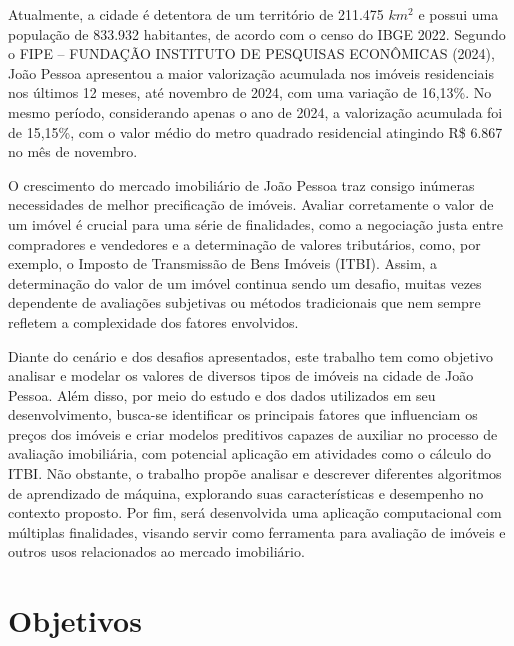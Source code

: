 \documentclass[
  12pt,
  a4paper,
]{scrreprt}
\begin{document}
\vspace{12pt}

Atualmente, a cidade é detentora de um território de 211.475 \(km^2\) e
possui uma população de 833.932 habitantes, de acordo com o censo do
IBGE 2022. Segundo o FIPE -- FUNDAÇÃO INSTITUTO DE PESQUISAS ECONÔMICAS
(2024), João Pessoa apresentou a maior valorização acumulada nos imóveis
residenciais nos últimos 12 meses, até novembro de 2024, com uma
variação de 16,13\%. No mesmo período, considerando apenas o ano de
2024, a valorização acumulada foi de 15,15\%, com o valor médio do metro
quadrado residencial atingindo R\$ 6.867 no mês de novembro.

\vspace{12pt}

O crescimento do mercado imobiliário de João Pessoa traz consigo
inúmeras necessidades de melhor precificação de imóveis. Avaliar
corretamente o valor de um imóvel é crucial para uma série de
finalidades, como a negociação justa entre compradores e vendedores e a
determinação de valores tributários, como, por exemplo, o Imposto de
Transmissão de Bens Imóveis (ITBI). Assim, a determinação do valor de um
imóvel continua sendo um desafio, muitas vezes dependente de avaliações
subjetivas ou métodos tradicionais que nem sempre refletem a
complexidade dos fatores envolvidos.

\vspace{12pt}

Diante do cenário e dos desafios apresentados, este trabalho tem como
objetivo analisar e modelar os valores de diversos tipos de imóveis na
cidade de João Pessoa. Além disso, por meio do estudo e dos dados
utilizados em seu desenvolvimento, busca-se identificar os principais
fatores que influenciam os preços dos imóveis e criar modelos preditivos
capazes de auxiliar no processo de avaliação imobiliária, com potencial
aplicação em atividades como o cálculo do ITBI. Não obstante, o trabalho
propõe analisar e descrever diferentes algoritmos de aprendizado de
máquina, explorando suas características e desempenho no contexto
proposto. Por fim, será desenvolvida uma aplicação computacional com
múltiplas finalidades, visando servir como ferramenta para avaliação de
imóveis e outros usos relacionados ao mercado imobiliário.

\section{Objetivos}\label{objetivos}
\end{document}
